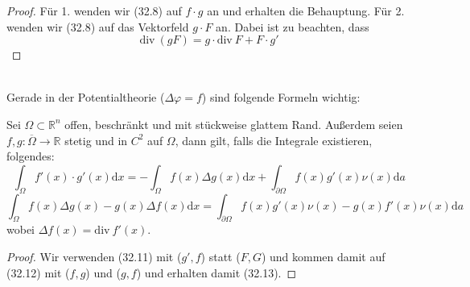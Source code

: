 \begin{proof}
Für 1. wenden wir (32.8) auf $f\cdot g$ an und erhalten die 
Behauptung. Für 2. wenden wir (32.8) auf das Vektorfeld 
$g\cdot F$ an. Dabei ist zu beachten, dass
\begin{equation*}
	\mathrm{div\ }(gF)=g\cdot\mathrm{div\ }F + F\cdot g'
\end{equation*}
\end{proof}
\ \\
Gerade in der Potentialtheorie ($\Delta\varphi=f$) sind folgende 
Formeln wichtig:
\newpage
\begin{satz}
Sei $\Omega\subset\mathbb{R}^n$ offen, beschränkt und mit 
stückweise glattem Rand. Außerdem seien $f,g:\overline{\Omega} 
\rightarrow\mathbb{R}$ stetig und in $C^2$ auf $\Omega$, 
dann gilt, falls die Integrale existieren, folgendes:
\begin{equation}
	\int_\Omega f'(x)\cdot g'(x)\mathrm{d}x = 
	-\int_\Omega f(x)\Delta g(x)\mathrm{d}x + 
	\int_{\partial\Omega}f(x)g'(x)\nu(x)\mathrm{d}a
\end{equation}
\begin{equation}
	\int_{\Omega}f(x)\Delta g(x)-g(x)\Delta f(x)\mathrm{d}x = 
	\int_{\partial\Omega}f(x)g'(x)\nu(x) - 
	g(x)f'(x)\nu(x)\mathrm{d}a 
\end{equation}
wobei $\Delta f(x)=\mathrm{div\ }f'(x)$.
\end{satz}

\begin{proof}
Wir verwenden (32.11) mit ($g',f$) statt ($F,G$) und kommen 
damit auf (32.12) mit ($f,g$) und ($g,f$) und erhalten damit
(32.13).
\end{proof}

